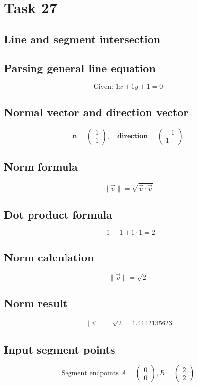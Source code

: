 \documentclass{article}
\begin{document}
\hrulefill
\bigskip

\section*{Task 27}

\subsection*{Line and segment intersection}
\subsection*{ \vspace{1em} Parsing general line equation}
\[
\text{Given: } 1x + 1y + 1 = 0
\]
\subsection*{ \vspace{1em} Normal vector and direction vector}
\[
\mathbf{n} = \begin{pmatrix}1 \\ 1\end{pmatrix}, \quad
           \mathbf{direction} = \begin{pmatrix}-1 \\ 1\end{pmatrix}
\]
\subsection*{ \vspace{1em} Norm formula}
\[
\|\vec{v}\| = \sqrt{\vec{v} \cdot \vec{v}}
\]
\subsection*{ \vspace{1em} Dot product formula}
\[
-1 \cdot -1 + 1 \cdot 1 = 2
\]
\subsection*{ \vspace{1em} Norm calculation}
\[
\|\vec{v}\| = \sqrt{2}
\]
\subsection*{ \vspace{1em} Norm result}
\[
\|\vec{v}\| = \sqrt{2} = 1.4142135623
\]
\subsection*{ \vspace{1em} Input segment points}
\[
\text{Segment endpoints } A = \begin{pmatrix}0 \\ 0\end{pmatrix}, B = \begin{pmatrix}2 \\ 2\end{pmatrix}
\]
\end{document}
